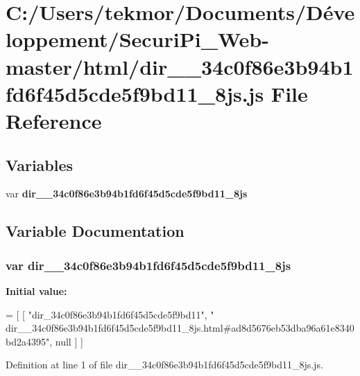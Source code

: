 \section{C\+:/\+Users/tekmor/\+Documents/\+Développement/\+Securi\+Pi\+\_\+\+Web-\/master/html/dir\+\_\+\+\_\+34c0f86e3b94b1fd6f45d5cde5f9bd11\+\_\+8js.js File Reference}
\label{dir____34c0f86e3b94b1fd6f45d5cde5f9bd11__8js_8js}
\subsection*{Variables}
\begin{DoxyCompactItemize}
\item 
var {\bf dir\+\_\+\+\_\+34c0f86e3b94b1fd6f45d5cde5f9bd11\+\_\+8js}
\end{DoxyCompactItemize}


\subsection{Variable Documentation}
\subsubsection[{dir\+\_\+\+\_\+34c0f86e3b94b1fd6f45d5cde5f9bd11\+\_\+8js}]{\setlength{\rightskip}{0pt plus 5cm}var dir\+\_\+\+\_\+34c0f86e3b94b1fd6f45d5cde5f9bd11\+\_\+8js}\label{dir____34c0f86e3b94b1fd6f45d5cde5f9bd11__8js_8js_a79d7d962e23b6db02e80c077e1eac24a}
{\bfseries Initial value\+:}
\begin{DoxyCode}
=
[
    [ \textcolor{stringliteral}{"dir\_34c0f86e3b94b1fd6f45d5cde5f9bd11"}, \textcolor{stringliteral}{"
      dir\_\_34c0f86e3b94b1fd6f45d5cde5f9bd11\_8js.html#ad8d5676eb53dba96a61e8340bd2a4395"}, null ]
]
\end{DoxyCode}


Definition at line 1 of file dir\+\_\+\+\_\+34c0f86e3b94b1fd6f45d5cde5f9bd11\+\_\+8js.\+js.

